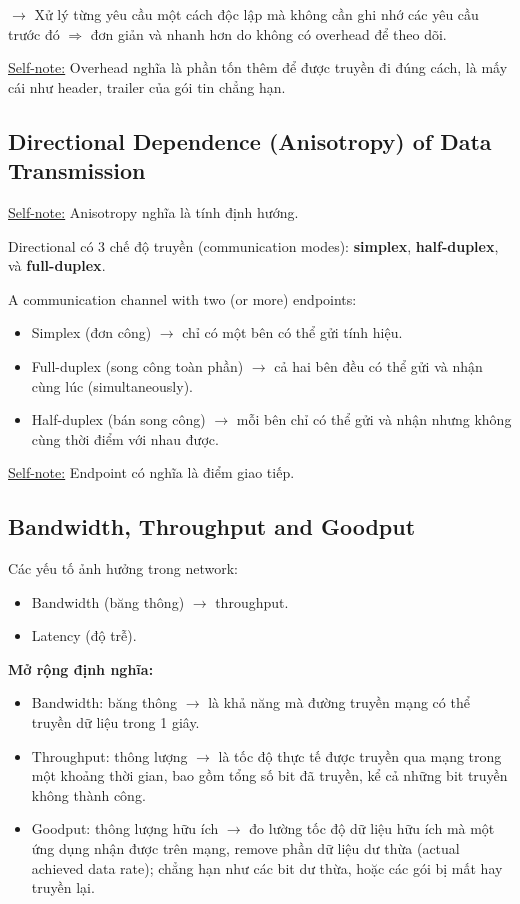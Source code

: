 \noindent
$\rightarrow$ Xử lý từng yêu cầu một cách độc lập mà không cần ghi nhớ các yêu cầu trước đó $\Rightarrow$ đơn giản và nhanh hơn do không có overhead để theo dõi.
\medskip

\noindent
\underline{Self-note:} Overhead nghĩa là phần tốn thêm để được truyền đi đúng cách, là mấy cái như header, trailer của gói tin chẳng hạn.
\medskip

\subsection{Directional Dependence (Anisotropy) of Data Transmission}

\noindent
\underline{Self-note:} Anisotropy nghĩa là tính định hướng.
\medskip

\noindent
Directional có 3 chế độ truyền (communication modes): \textbf{simplex}, \textbf{half-duplex}, và \textbf{full-duplex}.
\medskip

\noindent
A communication channel with two (or more) endpoints:

\begin{itemize}
    \item Simplex (đơn công) $\rightarrow$ chỉ có một bên có thể gửi tính hiệu.
    \item Full-duplex (song công toàn phần) $\rightarrow$ cả hai bên đều có thể gửi và nhận cùng lúc (simultaneously).
    \item Half-duplex (bán song công) $\rightarrow$ mỗi bên chỉ có thể gửi và nhận nhưng không cùng thời điểm với nhau được.
\end{itemize}

\noindent
\underline{Self-note:} Endpoint có nghĩa là điểm giao tiếp.
\medskip

\subsection{Bandwidth, Throughput and Goodput}

\noindent
Các yếu tố ảnh hưởng trong network:

\begin{itemize}
    \item Bandwidth (băng thông) $\rightarrow$ throughput.
    \item Latency (độ trễ).
\end{itemize}
\medskip

\noindent
\textbf{Mở rộng định nghĩa:}

\begin{itemize}
    \item Bandwidth: băng thông $\rightarrow$ là khả năng mà đường truyền mạng có thể truyền dữ liệu trong 1 giây.
    \item Throughput: thông lượng $\rightarrow$ là tốc độ thực tế được truyền qua mạng trong một khoảng thời gian, bao gồm tổng số bit đã truyền, kể cả những bit truyền không thành công.
    \item Goodput: thông lượng hữu ích $\rightarrow$ đo lường tốc độ dữ liệu hữu ích mà một ứng dụng nhận được trên mạng, remove phần dữ liệu dư thừa (actual achieved data rate); chẳng hạn như các bit dư thừa, hoặc các gói bị mất hay truyền lại.
\end{itemize}
\medskip

